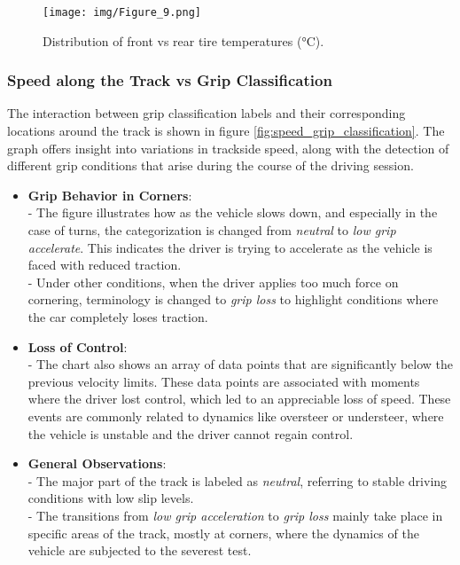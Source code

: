 \documentclass[a4paper,final,12pt]{report}
\begin{document}
\begin{figure}[H]
    \centering
    \texttt{[image: img/Figure\_9.png]}
    \caption{Distribution of front vs rear tire temperatures (°C).}
    \label{fig:tire_temperature_distribution}
\end{figure}

\subsubsection{Speed along the Track vs Grip Classification}
The interaction between grip classification labels and their corresponding locations around the track is shown in figure \ref{fig:speed_grip_classification}. The graph offers insight into variations in trackside speed, along with the detection of different grip conditions that arise during the course of the driving session.

\begin{itemize}
    \item \textbf{Grip Behavior in Corners}: \\
    - The figure illustrates how as the vehicle slows down, and especially in the case of turns, the categorization is changed from \textit{neutral} to \textit{low grip accelerate}. This indicates the driver is trying to accelerate as the vehicle is faced with reduced traction.\\
    - Under other conditions, when the driver applies too much force on cornering, terminology is changed to \textit{grip loss} to highlight conditions where the car completely loses traction.

    \item \textbf{Loss of Control}: \\
    - The chart also shows an array of data points that are significantly below the previous velocity limits. These data points are associated with moments where the driver lost control, which led to an appreciable loss of speed. These events are commonly related to dynamics like oversteer or understeer, where the vehicle is unstable and the driver cannot regain control.

    \item \textbf{General Observations}: \\
    -  The major part of the track is labeled as \textit{neutral}, referring to stable driving conditions with low slip levels.\\
    - The transitions from \textit{low grip acceleration} to \textit{grip loss} mainly take place in specific areas of the track, mostly at corners, where the dynamics of the vehicle are subjected to the severest test.
\end{itemize}
\end{document}
